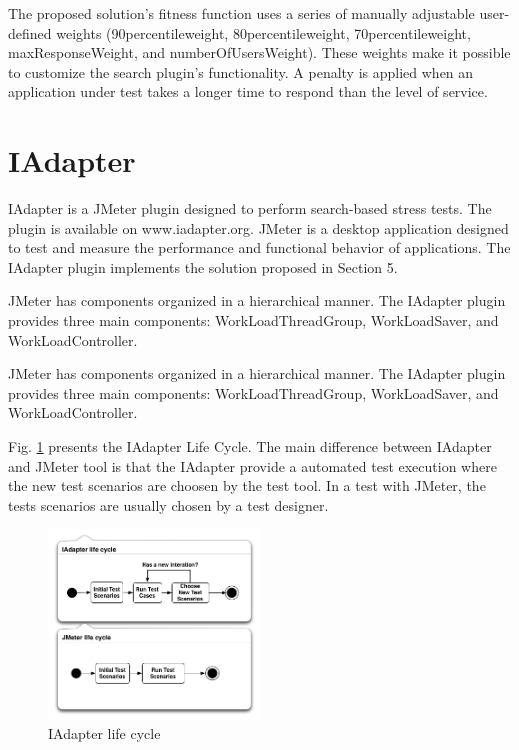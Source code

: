 \documentclass[conference]{IEEEtran}
\begin{document}
The proposed solution's fitness function uses a series of manually adjustable user-defined weights (90percentileweight, 80percentileweight,  70percentileweight, maxResponseWeight, and numberOfUsersWeight). These weights make it possible to customize the search plugin's functionality. A penalty is applied when an application under test takes a longer time to respond than the level of service.


\section{IAdapter}

IAdapter is a JMeter plugin designed to perform search-based stress tests.  The plugin is available on www.iadapter.org. JMeter is a desktop application designed to test and measure the performance and functional behavior of applications. The IAdapter plugin implements the solution proposed in Section 5.

JMeter has components organized  in a hierarchical manner. The IAdapter plugin provides three main components: WorkLoadThreadGroup, WorkLoadSaver, and WorkLoadController.
 
JMeter has components organized  in a hierarchical manner. The IAdapter plugin provides three main components: WorkLoadThreadGroup, WorkLoadSaver, and WorkLoadController.


Fig. \ref{fig:iadapterlifecycle} presents the IAdapter Life Cycle. The main difference between IAdapter and JMeter tool is that the IAdapter provide a automated test execution where the new test scenarios are choosen by the test tool.  In a test with JMeter, the tests scenarios are usually chosen by a test designer.

\begin{figure}[h]
\includegraphics[width=0.5\textwidth]{./images/lifecycle.png}
\caption{IAdapter life cycle}
\label{fig:iadapterlifecycle}
\end{figure}
\end{document}
